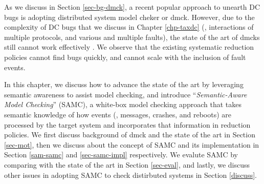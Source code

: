 
As we discuss in Section \ref{sec-bg-dmck}, a recent popular approach to unearth
DC bugs is adopting distributed system model cheker or dmck. However, due to the
complexity of DC bugs that we discuss in Chapter \ref{chp-taxdc} (\eg,
interactions of multiple protocols, and various and multiple faults), the state
of the art of dmcks still cannot work effectively \cite{Guo+11-Demeter,
Killian+07-LifeDeathMaceMC, Simsa+10-Dbug, Yang+09-Modist}.  We observe that
the existing systematic reduction policies cannot find bugs quickly, and cannot
scale with the inclusion of fault events.

In this chapter, we discuss how to advance the state of the art by leveraging
semantic awareness to assist model checking, and introduce
``\textit{Semantic-Aware Model Checking}'' (SAMC), a white-box model checking
approach that takes semantic knowledge of how events (\eg, messages, crashes,
and reboots) are processed by the target system and incorporates that
information in reduction policies. We first discuss background of dmck and the
state of the art in Section \ref{sec-mot}, then we discuss about the concept of
SAMC and its implementation in Section \ref{sam-samc} and \ref{sec-samc-impl}
respectively. We evalute SAMC by comparing with the state of the art in Section
\ref{sec-eval}, and lastly, we discuss other issues in adopting SAMC to check
distirbuted systems in Section \ref{discuss}.


